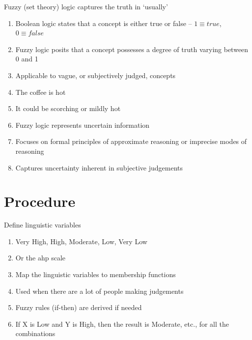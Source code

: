 \documentclass[aspectratio=1610,pdftex,dvipsnames,compress,xcolor={dvipsnames}]{beamer}
\newcommand{\acs}{\acrshort} %
\begin{document}
\addtocounter{framenumber}{-1}
\begin{frame}{Fuzzy (set theory) logic captures the truth in `usually'}
    \begin{enumerate}[series=outerlist,topsep=0pt,itemsep=15pt,leftmargin=*,label=(\arabic*)]
        \item[]Boolean logic states that a concept is either true or false -- $1 \equiv true$, $0 \equiv false$
        \item[]Fuzzy logic posits that a concept possesses a degree of truth varying between 0 and 1 
        \item[]Applicable to vague, or subjectively judged, concepts
        \item[]The coffee is hot
        \item[]It could be scorching or mildly hot
        \item[]Fuzzy logic represents uncertain information
        \item[]Focuses on formal principles of approximate reasoning or imprecise modes of reasoning
        \item[]Captures uncertainty inherent in subjective judgements
    \end{enumerate}
\end{frame}


\section{Procedure}


\addtocounter{framenumber}{-1}
\begin{frame}{Define linguistic variables}
    \begin{enumerate}[series=outerlist,topsep=0pt,itemsep=15pt,leftmargin=*,label=(\arabic*)]
        \item[]Very High, High, Moderate, Low, Very Low
        \item[]Or the \acs{ahp} scale
        \item[]Map the linguistic variables to membership functions
        \item[]Used when there are a lot of people making judgements 
        \item[]Fuzzy rules (if-then) are derived if needed
        \item[]If X is Low and Y is High, then the result is Moderate, etc., for all the combinations
    \end{enumerate}
\end{frame}
\end{document}
